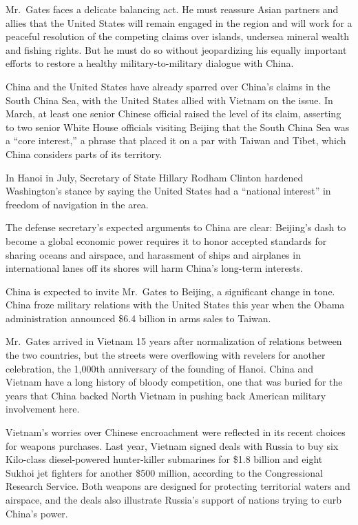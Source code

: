 ﻿\documentclass[12pt]{article}
\begin{document}
Mr.~Gates faces a delicate balancing act. He must reassure Asian partners and allies that the United
States will remain engaged in the region and will work for a peaceful resolution of the competing
claims over islands, undersea mineral wealth and fishing rights. But he must do so without
jeopardizing his equally important efforts to restore a healthy military-to-military dialogue with
China.

China and the United States have already sparred over China's claims in the South China Sea, with
the United States allied with Vietnam on the issue. In March, at least one senior Chinese official
raised the level of its claim, asserting to two senior White House officials visiting Beijing that
the South China Sea was a ``core interest,'' a phrase that placed it on a par with Taiwan and Tibet,
which China considers parts of its territory.

In Hanoi in July, Secretary of State Hillary Rodham Clinton hardened Washington's stance by saying
the United States had a ``national interest'' in freedom of navigation in the area.

The defense secretary's expected arguments to China are clear: Beijing's dash to become a global
economic power requires it to honor accepted standards for sharing oceans and airspace, and
harassment of ships and airplanes in international lanes off its shores will harm China's long-term
interests.

China is expected to invite Mr.~Gates to Beijing, a significant change in tone. China froze military
relations with the United States this year when the Obama administration announced \$6.4 billion in
arms sales to Taiwan.

Mr.~Gates arrived in Vietnam 15 years after normalization of relations between the two countries,
but the streets were overflowing with revelers for another celebration, the 1,000th anniversary of
the founding of Hanoi. China and Vietnam have a long history of bloody competition, one that was
buried for the years that China backed North Vietnam in pushing back American military involvement
here.

Vietnam's worries over Chinese encroachment were reflected in its recent choices for weapons
purchases. Last year, Vietnam signed deals with Russia to buy six Kilo-class diesel-powered
hunter-killer submarines for \$1.8 billion and eight Sukhoi jet fighters for another \$500 million,
according to the Congressional Research Service. Both weapons are designed for protecting
territorial waters and airspace, and the deals also illustrate Russia's support of nations trying to
curb China's power.
\end{document}
